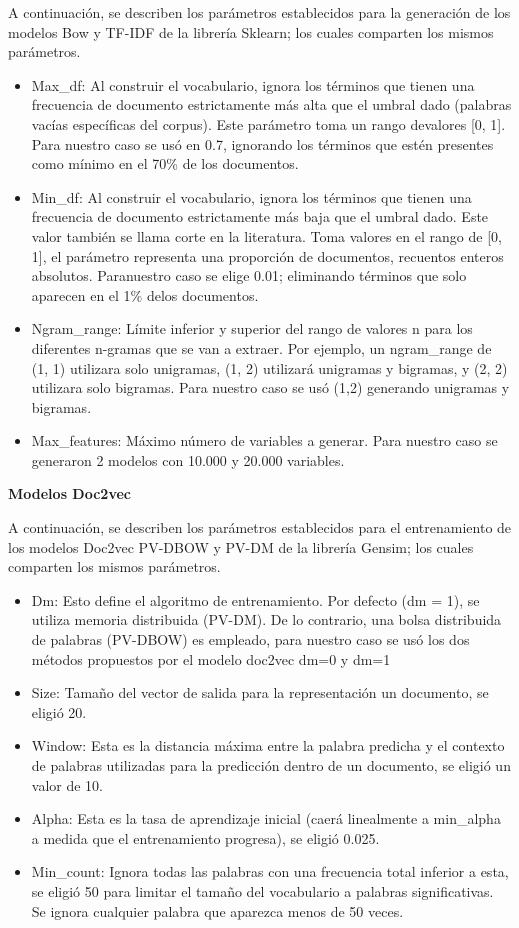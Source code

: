 A continuación, se describen los parámetros establecidos para la generación de los modelos Bow y TF-IDF de la librería Sklearn; los cuales comparten los mismos parámetros.
\begin{itemize}
	\item Max\_df: Al construir el vocabulario, ignora los términos que tienen una frecuencia de documento estrictamente más alta que el umbral dado (palabras vacías específicas del corpus). Este parámetro toma un rango devalores [0, 1]. Para nuestro caso se usó en 0.7, ignorando los términos que estén presentes como mínimo en el 70\% de los documentos. 
	\item Min\_df: Al construir el vocabulario, ignora los términos que tienen una frecuencia de documento estrictamente más baja que el umbral dado. Este valor también se llama corte en la literatura. Toma valores en el rango de [0, 1], el parámetro representa una proporción de documentos, recuentos enteros absolutos. Paranuestro caso se elige 0.01;
		 eliminando términos que solo aparecen en el 1\% delos documentos.
	\item Ngram\_range: Límite inferior y superior del rango de valores n para los diferentes n-gramas que se van a extraer. Por ejemplo, un ngram\_range de (1, 1) utilizara solo unigramas, (1, 2) utilizará unigramas y bigramas, y (2, 2) utilizara solo bigramas. Para nuestro caso se usó (1,2) generando unigramas y bigramas.
	\item Max\_features: Máximo número de variables a generar. Para nuestro caso se generaron  2 modelos con 10.000 y 20.000 variables.

\end{itemize}


\textbf{Modelos Doc2vec}

A continuación, se describen los parámetros establecidos para el entrenamiento de los modelos Doc2vec PV-DBOW y PV-DM de la librería Gensim; los cuales comparten los mismos parámetros.

\begin{itemize}
  \item Dm: Esto define el algoritmo de entrenamiento. Por defecto  (dm = 1), se utiliza memoria distribuida (PV-DM). De lo contrario, una bolsa distribuida de palabras (PV-DBOW) es empleado, para nuestro caso se usó los  dos métodos propuestos  por el modelo doc2vec dm=0 y dm=1 
  \item Size: Tamaño del vector de salida para la representación un documento, se eligió 20.
  \item Window: Esta es la distancia máxima entre la palabra predicha y el contexto de palabras utilizadas para la predicción dentro de un documento, se eligió un valor de 10.
  \item Alpha: Esta es la tasa de aprendizaje inicial (caerá linealmente a min\_alpha a medida que el entrenamiento progresa), se eligió 0.025.
  \item Min\_count: Ignora todas las palabras con una frecuencia total inferior a esta, se eligió 50 para limitar el tamaño del vocabulario a palabras significativas. Se ignora cualquier palabra que aparezca menos de 50 veces.
\end{itemize}

